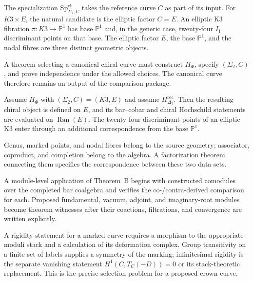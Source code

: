 \begin{theorem}
\label{thm:climax-crown-canonical-curve}
\ClaimStatusOpen
The specialization
\(\mathrm{Sp}^{\mathrm{ch}}_{\Sigma_2,C}\) takes the reference curve
\(C\) as part of its input.  For \(K3\times E\), the natural candidate
is the elliptic factor \(C=E\).  An elliptic K3 fibration
\(\pi\colon K3\to\mathbb P^1\) has base \(\mathbb P^1\) and, in the
generic case, twenty-four \(I_1\) discriminant points on that base.
The elliptic factor \(E\), the base \(\mathbb P^1\), and the nodal
fibres are three distinct geometric objects.

A theorem selecting a canonical chiral curve must construct
\(H_\Phi\), specify \((\Sigma_2,C)\), and prove independence under the
allowed choices.  The canonical curve therefore remains an output of
the comparison package.
\end{theorem}

\begin{corollary}
\label{cor:climax-crown-genus-stratified}
\ClaimStatusConditional
Assume \(H_\Phi\) with \((\Sigma_2,C)=(K3,E)\) and assume
\(H_{\Delta_5}^{\mathrm{rec}}\).  Then the resulting chiral object is
defined on \(E\), and its bar--cobar and chiral Hochschild statements
are evaluated on \(\operatorname{Ran}(E)\).  The twenty-four
discriminant points of an elliptic K3 enter through an additional
correspondence from the base \(\mathbb P^1\).
\end{corollary}

\begin{remark}
\label{rem:climax-crown-curve-richer}
Genus, marked points, and nodal fibres belong to the source geometry;
associator, coproduct, and completion belong to the algebra.  A
factorization theorem connecting them specifies the correspondence
between these two data sets.
\end{remark}

\begin{remark}
\label{rem:climax-named-module-scope-crown}
\ClaimStatusOpen
A module-level application of Theorem~B begins with constructed
comodules over the completed bar coalgebra and verifies the
co-/contra-derived comparison for each.  Proposed fundamental,
vacuum, adjoint, and imaginary-root modules become theorem witnesses
after their coactions, filtrations, and convergence are written
explicitly.
\end{remark}

\begin{remark}
\label{rem:climax-curve-selection-principle}
A rigidity statement for a marked curve requires a morphism to the
appropriate moduli stack and a calculation of its deformation
complex.  Group transitivity on a finite set of labels supplies a
symmetry of the marking; infinitesimal rigidity is the separate
vanishing statement \(H^1(C,T_C(-D))=0\) or its stack-theoretic
replacement.  This is the precise selection problem for a proposed
crown curve.
\end{remark}
